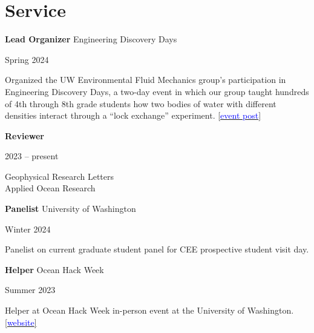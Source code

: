 \documentclass[letterpaper,11pt]{article}
\newenvironment{indentPar}[1]{
  \justifying
  \begin{list}{}{\setlength{\leftmargin}{#1}}%
  \item[]
}
{\end{list}}
\newcommand{\serviceExpEntry}[4]{
  \begin{minipage}[t]{.75\textwidth}
    \begin{flushleft}
      \textbf{#1}
      #2
    \end{flushleft}
  \end{minipage}
  \hfill
  \begin{minipage}[t]{.20\textwidth}
    \begin{flushright}
      #3%
    \end{flushright}
  \end{minipage}%
  \vspace{-7pt}
  \begin{indentPar}{0.5cm}
    #4%
  \end{indentPar}
}
\begin{document}
\section{Service}
\serviceExpEntry
  {Lead Organizer}{Engineering Discovery Days}
  {Spring 2024}
  {Organized the UW Environmental Fluid Mechanics group's participation in Engineering Discovery Days, a two-day event in which our group taught hundreds of 4th through 8th grade students how two bodies of water with different densities interact through a “lock exchange” experiment.
  \href{https://depts.washington.edu/uwefm/wordpress/2024-uw-engineering-discovery-days-lock-exchange-experiment/}{[\textcolor{blue}{event post}]}}
%
\serviceExpEntry
  {Reviewer}{}
  {2023 -- present}
  {Geophysical Research Letters\\
   Applied Ocean Research}
%
\serviceExpEntry
  {Panelist}{University of Washington}
  {Winter 2024}
  {Panelist on current graduate student panel for CEE prospective student visit day.}
%

\serviceExpEntry
  {Helper}{Ocean Hack Week}
  {Summer 2023}
  {Helper at Ocean Hack Week in-person event at the University of Washington. \href{https://oceanhackweek.org/ohw23/logistics/index.html}{[\textcolor{blue}{website}]}}
%
\end{document}
